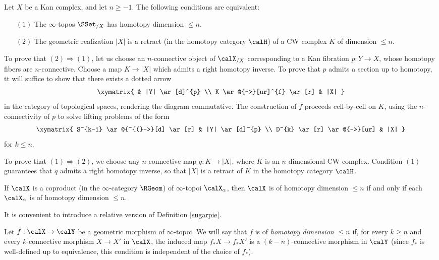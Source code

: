 \begin{example}\label{honepie}
Let $X$ be a Kan complex, and let $n \geq -1$. The following conditions are equivalent:
\begin{itemize}
\item[$(1)$] The $\infty$-topos $\SSet_{/X}$ has homotopy dimension $\leq n$.
\item[$(2)$] The geometric realization $|X|$ is a retract (in the homotopy category $\calH$) of a CW complex $K$ of dimension $\leq n$.
\end{itemize}
To prove that $(2) \Rightarrow (1)$, let us choose an $n$-connective
object of $\calX_{/X}$ corresponding to a Kan fibration $p: Y \rightarrow X$, whose homotopy fibers are $n$-connective. Choose a map $K \rightarrow |X|$ which admits a right homotopy inverse. 
To prove that $p$ admits a section up to homotopy, tt will suffice to show that there exists a dotted arrow $$ \xymatrix{ & |Y| \ar[d]^{p} \\
K \ar@{-->}[ur]^{f} \ar[r] & |X| }$$
in the category of topological spaces, rendering the diagram commutative. The construction
of $f$ proceeds cell-by-cell on $K$, using the $n$-connectivity of $p$ to solve lifting problems of the form
$$ \xymatrix{ S^{k-1} \ar@{^{(}->}[d] \ar[r] & |Y| \ar[d]^{p} \\
D^{k} \ar[r] \ar@{-->}[ur] & |X| }$$
for $k \leq n$.

To prove that $(1) \Rightarrow (2)$, we choose any $n$-connective map $q: K \rightarrow |X|$, where
$K$ is an $n$-dimensional CW complex. Condition $(1)$ guarantees that $q$ admits a right homotopy inverse, so that $|X|$ is a retract of $K$ in the homotopy category $\calH$.
\end{example}

\begin{remark}\label{inter}
If $\calX$ is a coproduct (in the $\infty$-category $\RGeom$) of $\infty$-topoi $\calX_{\alpha}$, then
$\calX$ is of homotopy dimension $\leq n$ if and
only if each $\calX_{\alpha}$ is of homotopy dimension $\leq n$.
\end{remark}

It is convenient to introduce a relative version of Definition \ref{sugarpie}.

\begin{definition}
Let $f: \calX \rightarrow \calY$ be a geometric morphism of $\infty$-topoi.
We will say that $f$ is of {\it homotopy dimension $\leq n$} if, for every $k \geq n$ and every
$k$-connective morphism $X \rightarrow X'$ in $\calX$, the induced map
$f_{\ast} X \rightarrow f_{\ast} X'$ is a $(k-n)$-connective morphism in $\calY$ (since $f_{\ast}$ is well-defined up to equivalence, this condition is independent of the choice of $f_{\ast}$).
\end{definition}

